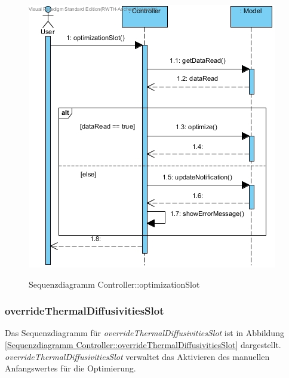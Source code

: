 \begin{figure}[H]
	\centering
	\includegraphics[scale=.65]{Bilder/Controller__optimizationSlot().jpg}\\
	\caption{Sequenzdiagramm Controller::optimizationSlot}
	\label{Sequenzdiagramm Controller::optimizationSlot}
\end{figure}

\subsubsection*{overrideThermalDiffusivitiesSlot}

Das Sequenzdiagramm für \emph{overrideThermalDiffusivitiesSlot} ist in Abbildung \ref{Sequenzdiagramm Controller::overrideThermalDiffusivitiesSlot} dargestellt. \emph{overrideThermalDiffusivitiesSlot} verwaltet das Aktivieren des manuellen Anfangswertes für die Optimierung.

